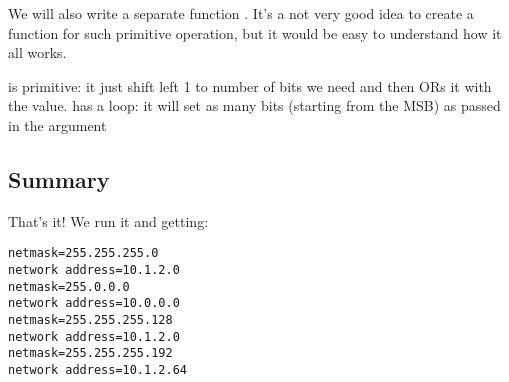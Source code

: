 We will also write a separate function . 
It's a not very good idea to create a function
for such primitive operation, but it would be easy to understand how it all works.



 is primitive: it just shift left 1 to number of bits we need and then 
ORs it with the  value.
 has a loop: it will set as many bits (starting from the \ac{MSB}) as 
passed in the  argument

\subsection{Summary}

That's it!
We run it and getting:

\begin{lstlisting}
netmask=255.255.255.0
network address=10.1.2.0
netmask=255.0.0.0
network address=10.0.0.0
netmask=255.255.255.128
network address=10.1.2.0
netmask=255.255.255.192
network address=10.1.2.64
\end{lstlisting}
